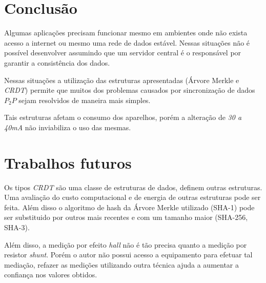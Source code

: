 \documentclass[12pt]{article}
\begin{document}
\section{Conclusão}

Algumas aplicações precisam funcionar mesmo em ambientes onde não exista acesso a internet ou mesmo uma rede de dados estável. Nessas situações não é possível desenvolver assumindo que um servidor central é o responsável por garantir a consistência dos dados.

Nessas situações a utilização das estruturas apresentadas (Árvore Merkle e {\it CRDT}) permite que muitos dos problemas causados por sincronização de dados \ensuremath{P_{2}P} sejam resolvidos de maneira mais simples.

Tais estruturas afetam o consumo dos aparelhos, porém a alteração de {\it 30 a 40mA} não inviabiliza o uso das mesmas.

\section{Trabalhos futuros}

Os tipos {\it CRDT} são uma classe de estruturas de dados, \cite{shapiro:11} definem outras estruturas. Uma avaliação do custo computacional e de energia de outras estruturas pode ser feita. Além disso o algoritmo de hash da Árvore Merkle utilizado (SHA-1) pode ser substituido por outros mais recentes e com um tamanho maior (SHA-256, SHA-3).

Além disso, a medição por efeito {\it hall} não é tão precisa quanto a medição por resistor {\it shunt}. Porém o autor não possui acesso a equipamento para efetuar tal mediação, refazer as medições utilizando outra técnica ajuda a aumentar a confiança nos valores obtidos.



\end{document}
